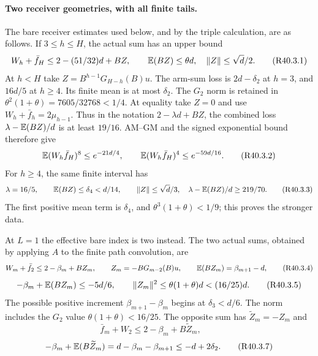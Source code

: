\paragraph{Two receiver geometries, with all finite tails.}
\label{part:r40:remaining-receivers}\label{part:R40.3.1}
The bare receiver estimates used below, and by the triple calculation,
are as follows. If \(3\le h\le H\), the actual sum has an upper bound
\[
 W_h+\bar f_H\le2-(51/32)d+BZ,\qquad
 \mathbb E(BZ)\le\theta d,\quad \|Z\|\le\sqrt d/2 .
 \tag{R40.3.1}
\]
At \(h<H\) take \(Z=B^{h-1}G_{H-h}(B)u\).
The arm-sum loss is \(2d-\delta_2\) at \(h=3\), and \(16d/5\)
at \(h\ge4\). Its finite mean is at most \(\delta_2\).
The \(G_2\) norm is retained in
\(\theta^2(1+\theta)=7605/32768<1/4\).
At equality take \(Z=0\) and use
\(W_h+\bar f_h=2\mu_{h-1}\).
Thus in the notation \(2-\lambda d+BZ\), the combined loss
\(\lambda-\mathbb E(BZ)/d\) is at least \(19/16\).
AM--GM and the signed exponential bound therefore give
\begin{equation}\label{eq:r40:remaining-bare-moments}
 \mathbb E(W_h\bar f_H)^8\le e^{-21d/4},\qquad
 \mathbb E(W_h\bar f_H)^4\le e^{-59d/16}.
 \tag{R40.3.2}
\end{equation}
For \(h\ge4\), the same finite interval has
\begin{equation}\label{eq:r40:remaining-bare-strong}
 \lambda=16/5,\qquad
 \mathbb E(BZ)\le\delta_4<d/14,\qquad
 \|Z\|\le\sqrt d/3,
 \quad\lambda-\mathbb E(BZ)/d\ge219/70.
 \tag{R40.3.3}
\end{equation}
The first positive mean term is \(\delta_4\), and
\(\theta^3(1+\theta)<1/9\); this proves the stronger data.

At \(L=1\) the effective bare index is two instead. The two actual
sums, obtained by applying \(A\) to the finite path convolution, are
\[
 W_m+\bar f_2\le2-\beta_m+BZ_m,\qquad
 Z_m=-BG_{m-2}(B)u,\qquad
 \mathbb E(BZ_m)=\beta_{m+1}-d,
 \tag{R40.3.4}
\]
\[
 -\beta_m+\mathbb E(BZ_m)\le-5d/6,\qquad
 \|Z_m\|^2\le\theta(1+\theta)d<(16/25)d .
 \tag{R40.3.5}
\]
The possible positive increment \(\beta_{m+1}-\beta_m\) begins at
\(\delta_3<d/6\). The norm includes the \(G_2\) value
\(\theta(1+\theta)<16/25\).
The opposite sum has \(\widetilde Z_m=-Z_m\) and
\[
 \bar f_m+W_2\le2-\beta_m+B\widetilde Z_m,\qquad
 \tag{R40.3.6}
\]
\[
 -\beta_m+\mathbb E(B\widetilde Z_m)
 =d-\beta_m-\beta_{m+1}\le-d+2\delta_2 .
 \tag{R40.3.7}
\]

